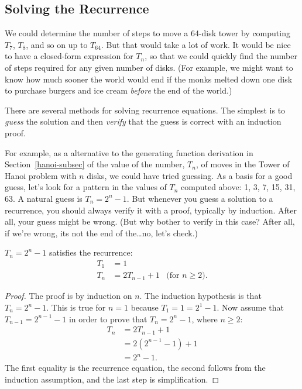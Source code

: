 \subsection{Solving the Recurrence}

We could determine the number of steps to move a 64-disk tower by
computing $T_7$, $T_8$, and so on up to $T_{64}$.  But that would take
a lot of work.  It would be nice to have a closed-form expression for
$T_n$, so that we could quickly find the number of steps required for
any given number of disks.  (For example, we might want to know how
much sooner the world would end if the monks melted down one disk to
purchase burgers and ice cream \emph{before} the end of the world.)
\fi

There are several methods for solving recurrence equations.  The
simplest is to \emph{guess} the solution and then \emph{verify} that
the guess is correct with an induction proof.

For example, as a alternative to the generating function derivation in
Section~\ref{hanoi-subsec} of the value of the number, $T_n$, of moves
in the Tower of Hanoi problem with $n$ disks, we could have tried
guessing.  As a basis for a good guess, let's look for a pattern in
the values of $T_n$ computed above: 1, 3, 7, 15, 31, 63.  A natural
guess is $T_n = 2^n - 1$.  But whenever you guess a solution to a
recurrence, you should always verify it with a proof, typically by
induction.  After all, your guess might be wrong.  (But why bother to
verify in this case?  After all, if we're wrong, its not the end of
the\dots no, let's check.)

\begin{claim}
$T_n = 2^n - 1$ satisfies the recurrence:
\begin{align*}
T_1 & = 1 \\
T_n & = 2T_{n-1} + 1 & \text{(for $n \geq 2$)}.
\end{align*}
\end{claim}
\begin{proof}
  The proof is by induction on $n$.  The induction hypothesis is that
  $T_n = 2^n - 1$.  This is true for $n = 1$ because $T_1 = 1 = 2^1 -
  1$.  Now assume that $T_{n-1} = 2^{n-1} - 1$ in order to prove
  that $T_n = 2^n - 1$, where $n \geq 2$:
\begin{align*}
T_{n} & = 2 T_{n-1} + 1 \\
  & = 2 (2^{n-1} - 1) + 1 \\
  & = 2^n - 1.
\end{align*}
The first equality is the recurrence equation, the second follows from
the induction assumption, and the last step is simplification.
\end{proof}

